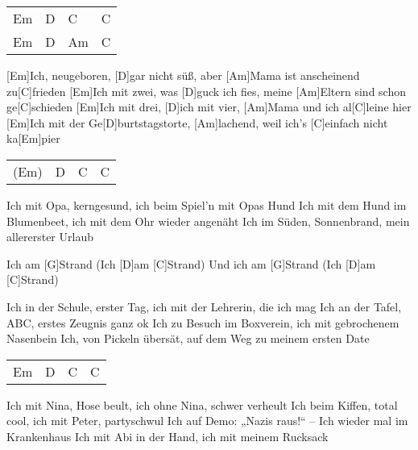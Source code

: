 

\begin{guitar}
	{\footnotesize\begin{tabular}{|l|l|l|l|}
			Em & D & C & C \\
			Em & D & Am & C
	\end{tabular}}

	[Em]Ich, neugeboren, [D]gar nicht süß, aber [Am]Mama ist anscheinend zu[C]frieden
	[Em]Ich mit zwei, was [D]guck ich fies, meine [Am]Eltern sind schon ge[C]schieden
	[Em]Ich mit drei, [D]ich mit vier, [Am]Mama und ich al[C]leine hier
	[Em]Ich mit der Ge[D]burtstagstorte, [Am]lachend, weil ich's [C]einfach nicht ka[Em]pier
	
	{\footnotesize\begin{tabular}{|l|l|l|l|}
			(Em) & D & C & C
	\end{tabular}}
	
	Ich mit Opa, kerngesund, ich beim Spiel'n mit Opas Hund
	Ich mit dem Hund im Blumenbeet, ich mit dem Ohr wieder angenäht
	Ich im Süden, Sonnenbrand, mein allererster Urlaub
	
	\begin{highlightbar}
		Ich am [G]Strand (Ich [D]am [C]Strand)
		Und ich am [G]Strand (Ich [D]am [C]Strand)
	\end{highlightbar}
	
	\songsection{Strophe 3}
	Ich in der Schule, erster Tag, ich mit der Lehrerin, die ich mag
	Ich an der Tafel, ABC, erstes Zeugnis ganz ok
	Ich zu Besuch im Boxverein, ich mit gebrochenem Nasenbein
	Ich, von Pickeln übersät, auf dem Weg zu meinem ersten Date
	
	{\footnotesize\begin{tabular}{|l|l|l|l|}
			Em & D & C & C
	\end{tabular}}

	\songsection{Strophe 4}
	Ich mit Nina, Hose beult, ich ohne Nina, schwer verheult
	Ich beim Kiffen, total cool, ich mit Peter, partyschwul
	Ich auf Demo: „Nazis raus!“ – Ich wieder mal im Krankenhaus
	Ich mit Abi in der Hand, ich mit meinem Rucksack
	
	\begin{highlightbar}
		  \optionalChord{(x2)}
	\end{highlightbar}
	

\end{guitar}

